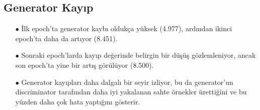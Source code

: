 \documentclass[10pt]{article}
\begin{document}
	\subsection{Generator Kayıp}
	\begin{itemize}
		\item[$\bullet$] İlk epoch'ta generator kaybı oldukça yüksek (4.977), ardından ikinci epoch'ta daha da artıyor (8.451).
		\item[$\bullet$] Sonraki epoch'larda kayıp değerinde belirgin bir düşüş gözlemleniyor, ancak son epoch'ta yine bir artış görülüyor (8.500).
		\item[$\bullet$] Generator kayıpları daha dalgalı bir seyir izliyor, bu da generator'un discriminator tarafından daha iyi yakalanan sahte örnekler ürettiğini ve bu yüzden daha çok hata yaptığını gösterir.
	\end{itemize}
	
	
	
	
	
	
	
	
	
	
	
	
	
	
\end{document}
